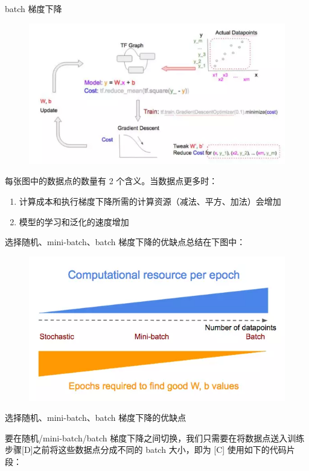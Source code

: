 \documentclass[11pt]{book} %
\begin{document}
batch 梯度下降
\begin{figure}
\centering
\includegraphics[width=0.7\linewidth]{figures/batch}
\caption{}
\label{fig:minibatch}
\end{figure}


每张图中的数据点的数量有 2 个含义。当数据点更多时：
\begin{enumerate}
\item 计算成本和执行梯度下降所需的计算资源（减法、平方、加法）会增加
\item 模型的学习和泛化的速度增加
\end{enumerate}

选择随机、mini-batch、batch 梯度下降的优缺点总结在下图中：

\begin{figure}
\centering
\includegraphics[width=0.7\linewidth]{figures/advantages}
\caption{}
\label{fig:advantages}
\end{figure}


选择随机、mini-batch、batch 梯度下降的优缺点

要在随机/mini-batch/batch 梯度下降之间切换，我们只需要在将数据点送入训练步骤[D]之前将这些数据点分成不同的 batch 大小，即为 [C] 使用如下的代码片段：
\end{document}
